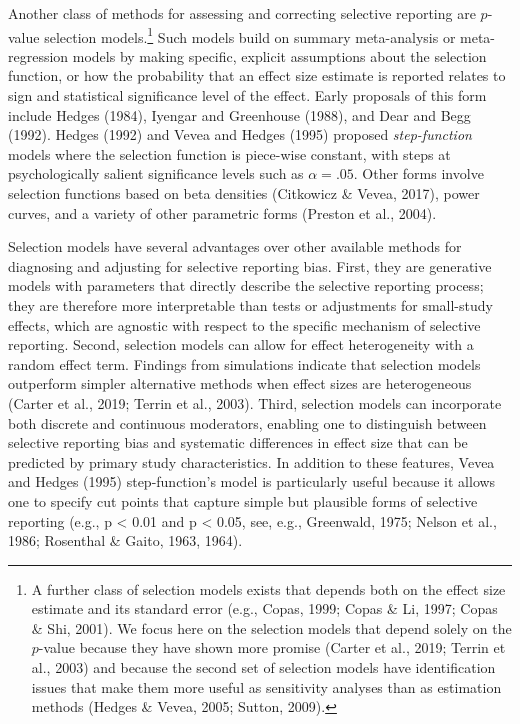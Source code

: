\documentclass[
  man, donotrepeattitle,floatsintext]{apa7}
\begin{document}
Another class of methods for assessing and correcting selective reporting are \(p\)-value selection models.\footnote{A further class of selection models exists that depends both on the effect size estimate and its standard error (e.g., Copas, 1999; Copas \& Li, 1997; Copas \& Shi, 2001). We focus here on the selection models that depend solely on the \(p\)-value because they have shown more promise (Carter et al., 2019; Terrin et al., 2003) and because the second set of selection models have identification issues that make them more useful as sensitivity analyses than as estimation methods (Hedges \& Vevea, 2005; Sutton, 2009).}
Such models build on summary meta-analysis or meta-regression models by making specific, explicit assumptions about the selection function, or how the probability that an effect size estimate is reported relates to sign and statistical significance level of the effect. Early proposals of this form include Hedges (1984), Iyengar and Greenhouse (1988), and Dear and Begg (1992). Hedges (1992) and Vevea and Hedges (1995) proposed \emph{step-function} models where the selection function is piece-wise constant, with steps at psychologically salient significance levels such as \(\alpha = .05\).
Other forms involve selection functions based on beta densities (Citkowicz \& Vevea, 2017), power curves, and a variety of other parametric forms (Preston et al., 2004).

Selection models have several advantages over other available methods for diagnosing and adjusting for selective reporting bias.
First, they are generative models with parameters that directly describe the selective reporting process; they are therefore more interpretable than tests or adjustments for small-study effects, which are agnostic with respect to the specific mechanism of selective reporting.
Second, selection models can allow for effect heterogeneity with a random effect term.
Findings from simulations indicate that selection models outperform simpler alternative methods when effect sizes are heterogeneous (Carter et al., 2019; Terrin et al., 2003).
Third, selection models can incorporate both discrete and continuous moderators, enabling one to distinguish between selective reporting bias and systematic differences in effect size that can be predicted by primary study characteristics.
In addition to these features, Vevea and Hedges (1995) step-function's model is particularly useful because it allows one to specify cut points that capture simple but plausible forms of selective reporting (e.g., p \textless{} 0.01 and p \textless{} 0.05, see, e.g., Greenwald, 1975; Nelson et al., 1986; Rosenthal \& Gaito, 1963, 1964).
\end{document}
